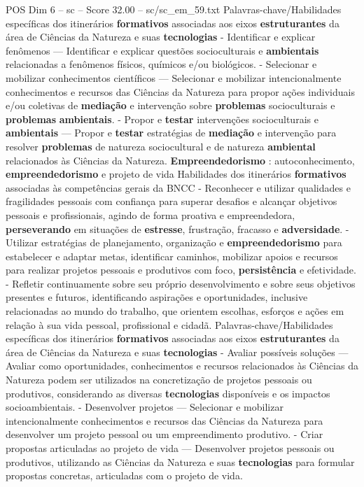 \begin{textsample}{POS Dim 6 – sc – Score 32.00 – sc/sc\_em\_59.txt}
Palavras-chave/Habilidades específicas dos itinerários \textbf{formativos} associadas aos eixos \textbf{estruturantes} da área de Ciências da Natureza e suas \textbf{tecnologias} - Identificar e explicar fenômenos — Identificar e explicar questões socioculturais e \textbf{ambientais} relacionadas a fenômenos físicos, químicos e/ou biológicos. - Selecionar e mobilizar conhecimentos científicos — Selecionar e mobilizar intencionalmente conhecimentos e recursos das Ciências da Natureza para propor ações individuais e/ou coletivas de \textbf{mediação} e intervenção sobre \textbf{problemas} socioculturais e \textbf{problemas} \textbf{ambientais}. - Propor e \textbf{testar} intervenções socioculturais e \textbf{ambientais} — Propor e \textbf{testar} estratégias de \textbf{mediação} e intervenção para resolver \textbf{problemas} de natureza sociocultural e de natureza \textbf{ambiental} relacionados às Ciências da Natureza. \textbf{Empreendedorismo} : autoconhecimento, \textbf{empreendedorismo} e projeto de vida Habilidades dos itinerários \textbf{formativos} associadas às competências gerais da BNCC - Reconhecer e utilizar qualidades e fragilidades pessoais com confiança para superar desafios e alcançar objetivos pessoais e profissionais, agindo de forma proativa e empreendedora, \textbf{perseverando} em situações de \textbf{estresse}, frustração, fracasso e \textbf{adversidade}. - Utilizar estratégias de planejamento, organização e \textbf{empreendedorismo} para estabelecer e adaptar metas, identificar caminhos, mobilizar apoios e recursos para realizar projetos pessoais e produtivos com foco, \textbf{persistência} e efetividade. - Refletir continuamente sobre seu próprio desenvolvimento e sobre seus objetivos presentes e futuros, identificando aspirações e oportunidades, inclusive relacionadas ao mundo do trabalho, que orientem escolhas, esforços e ações em relação à sua vida pessoal, profissional e cidadã.
Palavras-chave/Habilidades específicas dos itinerários \textbf{formativos} associadas aos eixos \textbf{estruturantes} da área de Ciências da Natureza e suas \textbf{tecnologias} - Avaliar possíveis soluções — Avaliar como oportunidades, conhecimentos e recursos relacionados às Ciências da Natureza podem ser utilizados na concretização de projetos pessoais ou produtivos, considerando as diversas \textbf{tecnologias} disponíveis e os impactos socioambientais. - Desenvolver projetos — Selecionar e mobilizar intencionalmente conhecimentos e recursos das Ciências da Natureza para desenvolver um projeto pessoal ou um empreendimento produtivo. - Criar propostas articuladas ao projeto de vida — Desenvolver projetos pessoais ou produtivos, utilizando as Ciências da Natureza e suas \textbf{tecnologias} para formular propostas concretas, articuladas com o projeto de vida.

\end{textsample}
